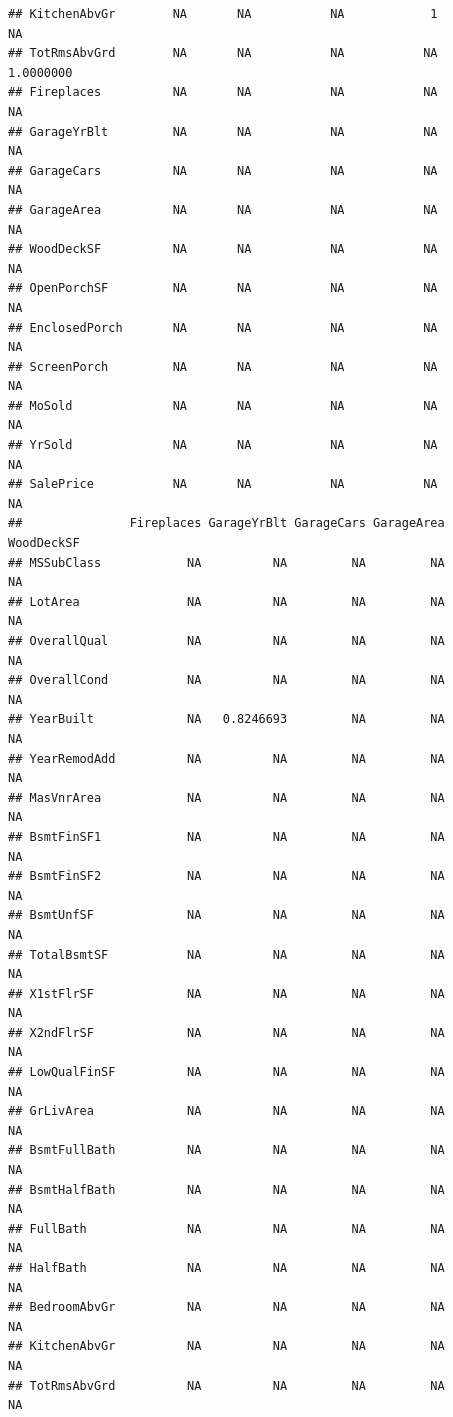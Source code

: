 \documentclass[
]{article}
\begin{document}
\begin{verbatim}
## KitchenAbvGr        NA       NA           NA            1           NA
## TotRmsAbvGrd        NA       NA           NA           NA    1.0000000
## Fireplaces          NA       NA           NA           NA           NA
## GarageYrBlt         NA       NA           NA           NA           NA
## GarageCars          NA       NA           NA           NA           NA
## GarageArea          NA       NA           NA           NA           NA
## WoodDeckSF          NA       NA           NA           NA           NA
## OpenPorchSF         NA       NA           NA           NA           NA
## EnclosedPorch       NA       NA           NA           NA           NA
## ScreenPorch         NA       NA           NA           NA           NA
## MoSold              NA       NA           NA           NA           NA
## YrSold              NA       NA           NA           NA           NA
## SalePrice           NA       NA           NA           NA           NA
##               Fireplaces GarageYrBlt GarageCars GarageArea WoodDeckSF
## MSSubClass            NA          NA         NA         NA         NA
## LotArea               NA          NA         NA         NA         NA
## OverallQual           NA          NA         NA         NA         NA
## OverallCond           NA          NA         NA         NA         NA
## YearBuilt             NA   0.8246693         NA         NA         NA
## YearRemodAdd          NA          NA         NA         NA         NA
## MasVnrArea            NA          NA         NA         NA         NA
## BsmtFinSF1            NA          NA         NA         NA         NA
## BsmtFinSF2            NA          NA         NA         NA         NA
## BsmtUnfSF             NA          NA         NA         NA         NA
## TotalBsmtSF           NA          NA         NA         NA         NA
## X1stFlrSF             NA          NA         NA         NA         NA
## X2ndFlrSF             NA          NA         NA         NA         NA
## LowQualFinSF          NA          NA         NA         NA         NA
## GrLivArea             NA          NA         NA         NA         NA
## BsmtFullBath          NA          NA         NA         NA         NA
## BsmtHalfBath          NA          NA         NA         NA         NA
## FullBath              NA          NA         NA         NA         NA
## HalfBath              NA          NA         NA         NA         NA
## BedroomAbvGr          NA          NA         NA         NA         NA
## KitchenAbvGr          NA          NA         NA         NA         NA
## TotRmsAbvGrd          NA          NA         NA         NA         NA

\end{verbatim}
\end{document}
